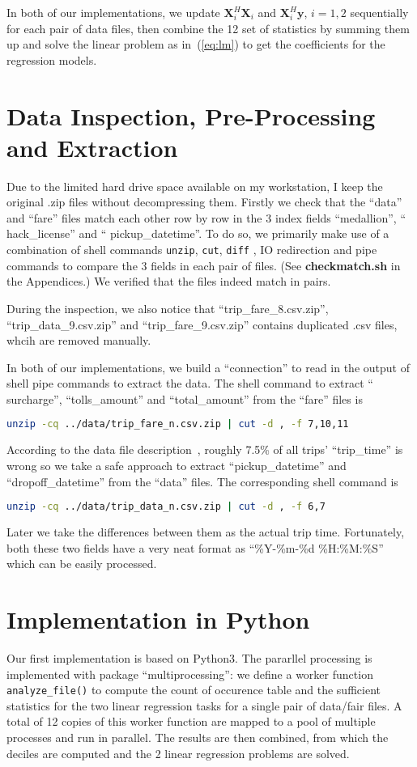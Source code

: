 \documentclass{article}
\begin{document}
In both of our implementations,  we update $\mathbf{X}_i^H\mathbf{X}_i$ and
$\mathbf{X}_i^H\mathbf{y}$, $i=1,2$ sequentially for each pair of data files,
then combine the 12 set of statistics by summing them up and solve the linear
problem as in~(\ref{eq:lm}) to get the coefficients for the regression models.

\section{Data Inspection, Pre-Processing and Extraction}
Due to the limited hard drive space available on my workstation, I keep the
original .zip files without decompressing them. Firstly we check that the
``data'' and ``fare'' files match each other row by row in the 3 index
fields ``medallion'', `` hack\_license'' and `` pickup\_datetime''. To do so, we
primarily make use of a combination of shell commands \texttt{unzip},
\texttt{cut}, \texttt{diff} , IO redirection and pipe commands to compare the 3
fields in each pair of files. (See \textbf{checkmatch.sh} in the Appendices.) We
verified that the files indeed match in pairs.

During the inspection, we also notice that ``trip\_fare\_8.csv.zip'',
``trip\_data\_9.csv.zip'' and ``trip\_fare\_9.csv.zip'' contains duplicated .csv
files, whcih are removed manually.

In both of our implementations, we build a ``connection'' to read in the output
of shell pipe commands to extract the data. The shell command to extract
`` surcharge'', ``tolls\_amount'' and ``total\_amount'' from the ``fare'' files
is
\begin{lstlisting}[language=sh]
    unzip -cq ../data/trip_fare_n.csv.zip | cut -d , -f 7,10,11
\end{lstlisting}

According to the data file description~\cite{}, roughly 7.5\% of all
trips' ``trip\_time'' is wrong so we take a safe approach to extract
``pickup\_datetime'' and ``dropoff\_datetime'' from the ``data'' files. The
corresponding shell command is
\begin{lstlisting}[language=sh]
    unzip -cq ../data/trip_data_n.csv.zip | cut -d , -f 6,7
\end{lstlisting}

Later we take the differences between them as the actual trip time. Fortunately,
both these two fields have a very neat format as ``\%Y-\%m-\%d \%H:\%M:\%S''
which can be easily processed.

\section{Implementation in Python}
Our first implementation is based on Python3. The pararllel processing is
implemented with package ``multiprocessing'': we define a worker function
\texttt{analyze\_file()} to compute the count of occurence table and the
sufficient statistics for the two linear regression tasks for a single pair of
data/fair files. A total of 12 copies of this worker function are mapped to a
pool of multiple processes and run in parallel. The results are then combined,
from which the deciles are computed and the 2 linear regression problems are
solved. 
\end{document}
